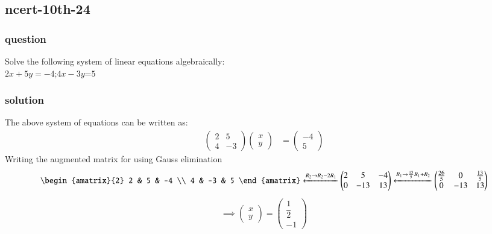 \documentclass[journal,12pt,onecolumn]{IEEEtran}
\theoremstyle{remark}
\begin{document}
\subsection{ncert-10th-24}
\subsubsection{question}
Solve the following system of linear equations algebraically:\\
$2x+5y=-4$;$4x-3y$=$5$
\subsubsection{solution}
The above system of equations can be written as:
\begin{align}
    \begin{pmatrix}
        2 & 5\\ 
        4 & -3
    \end{pmatrix}
    \begin{pmatrix}
        x\\
        y
    \end{pmatrix} &= \begin{pmatrix}
        -4\\
        5
    \end{pmatrix} \label{8}
    \end{align}
    Writing the augmented matrix for using Gauss elimination
    \begin{align}
        \begin{amatrix}{2}
   2 & 5 & -4 \\  4 & -3 & 5
 \end{amatrix} \xleftarrow{R_2 \to R_2-2R_1}
  \begin{pmatrix}
   2 & 5 & -4 \\  0 & -13 & 13
 \end{pmatrix} \xleftarrow{R_1 \to \frac{13}{5}R_1+R_2}
 \begin{pmatrix}
   \frac{26}{5} & 0 & \frac{13}{5} \\  0 & -13 & 13
 \end{pmatrix}  \label{14}
 \end{align}
 \begin{align}
     \implies \begin{pmatrix}
        x\\
        y
    \end{pmatrix} =
    \begin{pmatrix}
        \dfrac{1}{2}\\
        -1
    \end{pmatrix}
    \end{align}
\end{document}
